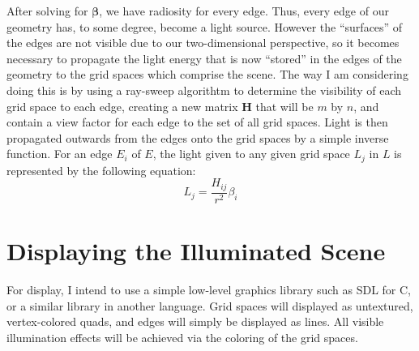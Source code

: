 \documentclass{article}
\newcommand{\vect}[1]{\boldsymbol{#1}}
\begin{document}
After solving for $\vect{\beta}$, we have radiosity for every edge. Thus, every edge of our geometry has, to some degree, become a light source. However the “surfaces” of the edges are not visible due to our two-dimensional perspective, so it becomes necessary to propagate the light energy that is now “stored” in the edges of the geometry to the grid spaces which comprise the scene. The way I am considering doing this is by using a ray-sweep algorithtm to determine the visibility of each grid space to each edge, creating a new matrix $\vect{H}$ that will be $m$ by $n$, and contain a view factor for each edge to the set of all grid spaces. Light is then propagated outwards from the edges onto the grid spaces by a simple inverse function. For an edge $E_i$ of $E$, the light given to any given grid space $L_{j}$ in $L$ is represented by the following equation:
\begin{equation}
L_{j}=\frac{H_{ij}}{r^2}\beta_i
\end{equation}

\section{Displaying the Illuminated Scene}
For display, I intend to use a simple low-level graphics library such as SDL for C, or a similar library in another language. Grid spaces will displayed as untextured, vertex-colored quads, and edges will simply be displayed as lines. All visible illumination effects will be achieved via the coloring of the grid spaces.
\end{document}
